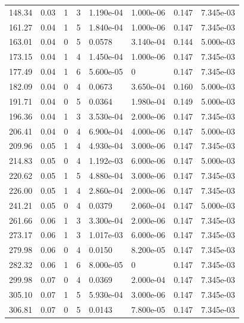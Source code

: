 \documentclass[preview]{standalone}
\begin{document}
{{\begin{tabular}{L{1.2cm}C{1.2cm} C{0.3cm}C{0.5cm} C{1.4cm}C{1.4cm} C{1.4cm}C{1.4cm}}
  148.34  &  0.03  & 1     &  3 &  1.190e-04  & 1.000e-06  & 0.147 &  7.345e-03   \\ 
  161.27  &  0.04  & 1     &  5 &  1.840e-04  & 1.000e-06  & 0.147 &  7.345e-03   \\ 
  163.01  &  0.04  & 0     &  5 &  0.0578  & 3.140e-04  & 0.144 &  5.000e-03   \\ 
  173.15  &  0.04  & 1     &  4 &  1.450e-04  & 1.000e-06  & 0.147 &  7.345e-03   \\ 
  177.49  &  0.04  & 1     &  6 &  5.600e-05  & 0  & 0.147 &  7.345e-03   \\ 
  182.09  &  0.04  & 0     &  4 &  0.0673  & 3.650e-04  & 0.160 &  5.000e-03   \\ 
  191.71  &  0.04  & 0     &  5 &  0.0364  & 1.980e-04  & 0.149 &  5.000e-03   \\ 
  196.36  &  0.04  & 1     &  3 &  3.530e-04  & 2.000e-06  & 0.147 &  7.345e-03   \\ 
  206.41  &  0.04  & 0     &  4 &  6.900e-04  & 4.000e-06  & 0.147 &  5.000e-03   \\ 
  209.96  &  0.05  & 1     &  4 &  4.930e-04  & 3.000e-06  & 0.147 &  7.345e-03   \\ 
  214.83  &  0.05  & 0     &  4 &  1.192e-03  & 6.000e-06  & 0.147 &  5.000e-03   \\ 
  220.62  &  0.05  & 1     &  5 &  4.880e-04  & 3.000e-06  & 0.147 &  7.345e-03   \\ 
  226.00  &  0.05  & 1     &  4 &  2.860e-04  & 2.000e-06  & 0.147 &  7.345e-03   \\ 
  241.21  &  0.05  & 0     &  4 &  0.0379  & 2.060e-04  & 0.147 &  5.000e-03   \\ 
  261.66  &  0.06  & 1     &  3 &  3.300e-04  & 2.000e-06  & 0.147 &  7.345e-03   \\ 
  273.17  &  0.06  & 1     &  3 &  1.017e-03  & 6.000e-06  & 0.147 &  7.345e-03   \\ 
  279.98  &  0.06  & 0     &  4 &  0.0150  & 8.200e-05  & 0.147 &  7.345e-03   \\ 
  282.32  &  0.06  & 1     &  6 &  8.000e-05  & 0  & 0.147 &  7.345e-03   \\ 
  299.98  &  0.07  & 0     &  4 &  0.0369  & 2.000e-04  & 0.147 &  7.345e-03   \\ 
  305.10  &  0.07  & 1     &  5 &  5.930e-04  & 3.000e-06  & 0.147 &  7.345e-03   \\ 
  306.81  &  0.07  & 0     &  5 &  0.0143  & 7.800e-05  & 0.147 &  7.345e-03   \\ 

\end{tabular}}}
\end{document}
